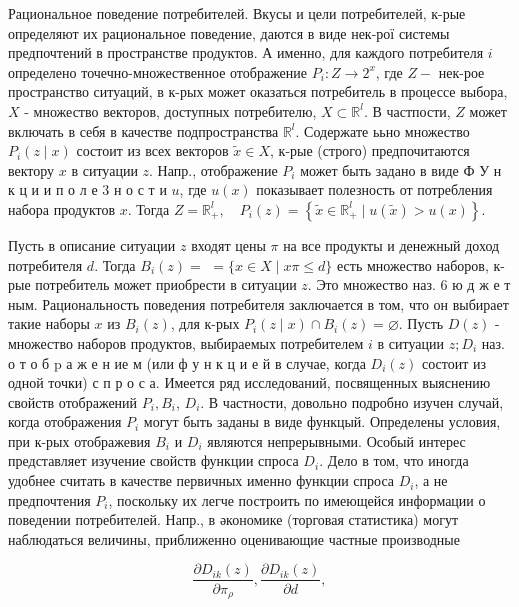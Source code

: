 \documentclass[10pt]{article}
\begin{document}
Рациональное поведение потребителей. Вкусы и цели потребителей, к-рые определяют их рациональное поведение, даются в виде нек-рої системы предпочтений в пространстве продуктов. А именно, для каждого потребителя $i$ определено точечно-множественное отображение $P_{i}: Z \rightarrow 2^{x}$, где $Z-$ нек-рое пространство ситуаций, в к-рых может оказаться потребитель в процессе выбора, $X$ - множество векторов, доступных потребителю, $X \subset \mathbb{R}^{l}$. В частпости, $Z$ может включать в себя в качестве подпространства $\mathbb{R}^{l}$. Содержате ььно множество $P_{i}(z \mid x)$ состоит из всех векторов $\tilde{x} \in X$, к-рые (строго) предпочитаются вектору $x$ в ситуации $z$. Напр., отображение $P_{i}$ может быть задано в виде Ф У н к ц и и п о л е 3 н о с т и $u$, где $u(x)$ показывает полезность от потребления набора продуктов $x$. Тогда $Z=\mathbb{R}_{+}^{l}, \quad P_{i}(z)=\left\{\tilde{x} \in \mathbb{R}_{+}^{l} \mid u(\tilde{x})>u(x)\right\}$.



Пусть в описание ситуации $z$ входят цены $\pi$ на все продукты и денежный доход потребителя $d$. Тогда $B_{i}(z)=$ $=\{x \in X \mid x \pi \leqslant d\}$ есть множество наборов, к-рые потребитель может приобрести в ситуации $z$. Это множество наз. 6 ю д ж е т ным. Рациональность поведения потребителя заключается в том, что он выбирает такие наборы $x$ из $B_{i}(z)$, для к-рых $P_{i}(z \mid x) \cap B_{i}(z)=\varnothing$. Пусть $D(z)$ - множество наборов продуктов, выбираемых потребителем $i$ в ситуации $z ; D_{i}$ наз. о т о б $\mathrm{p}$ а ж е н ие м (или ф у н к ц и е й в случае, когда $D_{i}(z)$ состоит из одной точки) с п р о с а. Имеется ряд исследований, посвященных выяснению свойств отображений $P_{i}, B_{i}$, $D_{i}$. В частности, довольно подробно изучен случай, когда отображения $P_{i}$ могут быть заданы в виде функцый. Определены условия, при к-рых отображевия $B_{i}$ и $D_{i}$ являются непрерывными. Особый интерес представляет изучение свойств функции спроса $D_{i}$. Дело в том, что иногда удобнее считать в качестве первичных именно функции спроса $D_{i}$, а не предпочтения $P_{i}$, поскольку их легче построить по имеющейся информации о поведении потребителей. Напр., в әкономике (торговая статистика) могут наблюдаться величины, приближенно оценивающие частные производные



\[

\frac{\partial D_{i k}(z)}{\partial \pi_{\rho}}, \frac{\partial D_{i k}(z)}{\partial d},

\]
\end{document}
